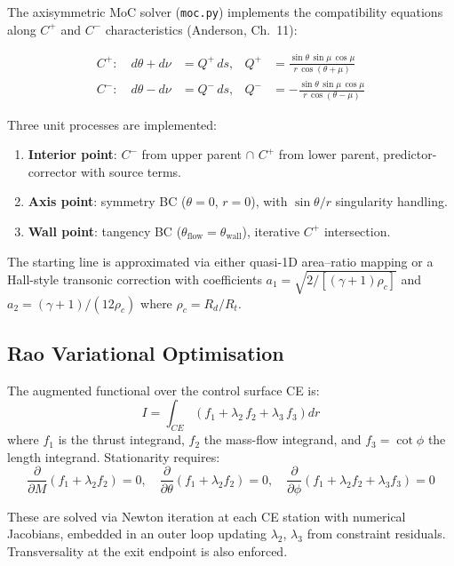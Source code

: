 \documentclass[11pt,a4paper]{article}
\begin{document}
The axisymmetric MoC solver (\texttt{moc.py}) implements the compatibility equations along $C^+$ and $C^-$ characteristics (Anderson, Ch.~11):

\begin{align}
C^+: \quad d\theta + d\nu &= Q^+\,ds, &
Q^+ &= \frac{\sin\theta\,\sin\mu\,\cos\mu}{r\,\cos(\theta+\mu)} \\
C^-: \quad d\theta - d\nu &= Q^-\,ds, &
Q^- &= -\frac{\sin\theta\,\sin\mu\,\cos\mu}{r\,\cos(\theta-\mu)}
\end{align}

Three unit processes are implemented:
\begin{enumerate}[nosep]
\item \textbf{Interior point}: $C^-$ from upper parent $\cap$ $C^+$ from lower parent, predictor-corrector with source terms.
\item \textbf{Axis point}: symmetry BC ($\theta=0$, $r=0$), with $\sin\theta/r$ singularity handling.
\item \textbf{Wall point}: tangency BC ($\theta_{\text{flow}} = \theta_{\text{wall}}$), iterative $C^+$ intersection.
\end{enumerate}

The starting line is approximated via either quasi-1D area--ratio mapping or a Hall-style transonic correction with coefficients $a_1 = \sqrt{2/[(\gamma+1)\rho_c]}$ and $a_2 = (\gamma+1)/(12\rho_c)$ where $\rho_c = R_d/R_t$.

\subsection{Rao Variational Optimisation}

The augmented functional over the control surface CE is:
\begin{equation}
I = \int_{CE} \left(f_1 + \lambda_2\,f_2 + \lambda_3\,f_3\right) dr
\end{equation}
where $f_1$ is the thrust integrand, $f_2$ the mass-flow integrand, and $f_3 = \cot\phi$ the length integrand. Stationarity requires:
\begin{equation}
\frac{\partial}{\partial M}(f_1+\lambda_2 f_2) = 0, \quad
\frac{\partial}{\partial\theta}(f_1+\lambda_2 f_2) = 0, \quad
\frac{\partial}{\partial\phi}(f_1+\lambda_2 f_2+\lambda_3 f_3) = 0
\end{equation}

These are solved via Newton iteration at each CE station with numerical Jacobians, embedded in an outer loop updating $\lambda_2$, $\lambda_3$ from constraint residuals. Transversality at the exit endpoint is also enforced.
\end{document}

